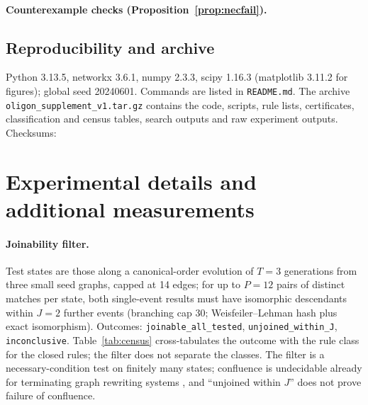\documentclass[10pt]{article}
\theoremstyle{definition}
\theoremstyle{plain}
\theoremstyle{remark}
\begin{document}
\paragraph{Counterexample checks (Proposition~\ref{prop:necfail}).}
{}
\subsection{Reproducibility and archive}
Python 3.13.5, networkx 3.6.1, numpy 2.3.3, scipy 1.16.3 (matplotlib 3.11.2 for figures); global seed 20240601. Commands are listed in \texttt{README.md}. The archive \texttt{oligon\_supplement\_v1.tar.gz} contains the code, scripts, rule lists, certificates, classification and census tables, search outputs and raw experiment outputs. Checksums:
{}

\section{Experimental details and additional measurements}\label{app:exp}
\paragraph{Joinability filter.} Test states are those along a canonical-order evolution of $T=3$ generations from three small seed graphs, capped at 14 edges; for up to $P=12$ pairs of distinct matches per state, both single-event results must have isomorphic descendants within $J=2$ further events (branching cap 30; Weisfeiler--Lehman hash plus exact isomorphism). Outcomes: \texttt{joinable\_all\_tested}, \texttt{unjoined\_within\_J}, \texttt{inconclusive}. Table~\ref{tab:census} cross-tabulates the outcome with the rule class for the closed rules; the filter does not separate the classes. The filter is a necessary-condition test on finitely many states; confluence is undecidable already for terminating graph rewriting systems \citep{plump2005}, and ``unjoined within $J$'' does not prove failure of confluence.
\begin{table}[t]\centering\small

\caption{Bounded joinability outcome by rule class (closed rules).}\label{tab:census}
\end{table}
\end{document}
